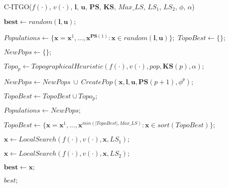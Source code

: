 \begin{breakablealgorithm}
\caption{C-ITGO($f(\cdot)$, $v(\cdot)$, $\bm{l}$, $\bm{u}$, $\bm{PS}$, $\bm{KS}$, $Max\_LS$, $LS_1$, $LS_2$, $\phi$, $\alpha$)}
\label{alg:ITGO}
\begin{spacing}{1.5}
\begin{algorithmic}[1]

\Statex
\State $\bm{best} \gets random(\bm{l}, \bm{u});$



\State $Populations \gets \{\bm{x} = \bm{x}^1, ..., \bm{x}^{\bm{PS}(1)} : \bm{x} \in random(\bm{l}, \bm{u}) \};$
\State $TopoBest \gets \{\};$


\State $NewPops \gets \{\};$


\State $Topo_p \gets TopographicalHeuristic(f(\cdot), v(\cdot), pop, \bm{KS}(p), \alpha);$



\State $NewPops \gets NewPops \ \cup \ CreatePop(\bm{x}, \bm{l}, \bm{u},\bm{PS}(p+1), \phi^p);$
\EndFor

\Else
\State $TopoBest \gets TopoBest \cup Topo_p;$
\EndIf
\EndFor

\State $Populations \gets NewPops;$
\EndIf
\EndFor

\State $TopoBest \gets \{\bm{x} = \bm{x}^1, ..., \bm{x}^{min(|TopoBest|, Max\_LS)} : \bm{x} \in sort(TopoBest)\};$


\State $\bm{x} \gets LocalSearch(f(\cdot), v(\cdot), \bm{x}, LS_1);$



\State $\bm{x} \gets LocalSearch(f(\cdot), v(\cdot), \bm{x}, LS_2);$


\State $\bm{best} \gets \bm{x};$
\EndIf
\EndIf

\EndFor

\EndWhile

\State \Return $best;$


\end{algorithmic}
\end{spacing}
\end{breakablealgorithm}